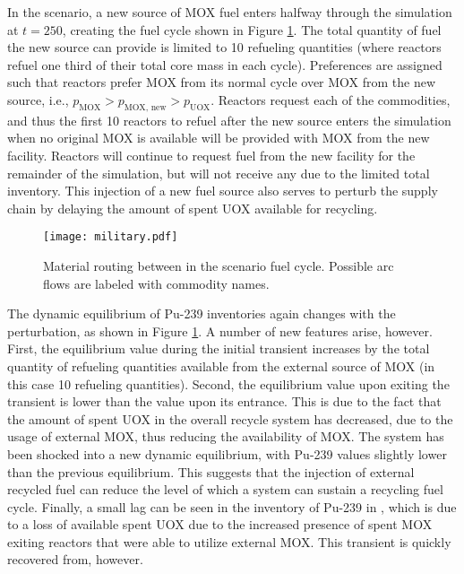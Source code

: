 In the \external scenario, a new source of MOX fuel enters halfway
through the simulation at $t = 250$, creating the fuel cycle shown in Figure
\ref{fig:military}. The total quantity of fuel the new source can provide is
limited to 10 refueling quantities (where reactors refuel one third of their
total core mass in each cycle). Preferences are assigned such that reactors
prefer MOX from its normal cycle over MOX from the new source, i.e.,
$p_{\text{MOX}} > p_{\text{MOX, new}} > p_{\text{UOX}}$. Reactors request each
of the commodities, and thus the first 10 reactors to refuel after the new
source enters the simulation when no original MOX is available will be provided
with MOX from the new facility. Reactors will continue to request fuel from the
new facility for the remainder of the simulation, but will not receive any due
to the limited total inventory. This injection of a new fuel source also serves to
perturb the supply chain by delaying the amount of spent UOX available for
recycling.

\begin{figure}
  \begin{center}
    \texttt{[image: military.pdf]}
    \caption[]{
      \label{fig:military}
      Material routing between in the \external scenario fuel
      cycle. Possible arc flows are labeled with commodity names.}
  \end{center}
\end{figure}

The dynamic equilibrium of Pu-239 inventories again changes with the \external
perturbation, as shown in Figure \ref{fig:military}. A number of new features
arise, however. First, the equilibrium value during the initial transient
increases by the total quantity of refueling quantities available from the
external source of MOX (in this case 10 refueling quantities). Second, the
equilibrium value upon exiting the transient is lower than the value upon its
entrance. This is due to the fact that the amount of spent UOX in the overall
recycle system has decreased, due to the usage of external MOX, thus reducing
the availability of MOX. The system has been shocked into a new dynamic
equilibrium, with Pu-239 values slightly lower than the previous
equilibrium. This suggests that the injection of external recycled fuel can
reduce the level of which a system can sustain a recycling fuel cycle. Finally,
a small lag can be seen in the inventory of Pu-239 in \fabrication, which is due
to a loss of available spent UOX due to the increased presence of spent MOX
exiting reactors that were able to utilize external MOX. This transient is
quickly recovered from, however.

